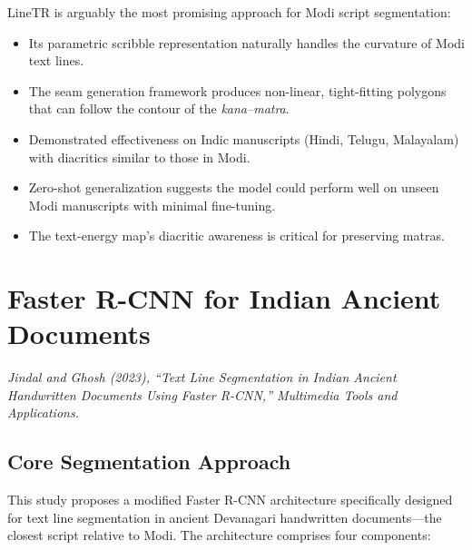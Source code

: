\documentclass[11pt, a4paper]{article}
\begin{document}
LineTR is arguably the most promising approach for Modi script segmentation:
\begin{itemize}[leftmargin=1.5em]
    \item Its parametric scribble representation naturally handles the curvature of Modi text lines.
    \item The seam generation framework produces non-linear, tight-fitting polygons that can follow the contour of the \textit{kana--matra}.
    \item Demonstrated effectiveness on Indic manuscripts (Hindi, Telugu, Malayalam) with diacritics similar to those in Modi.
    \item Zero-shot generalization suggests the model could perform well on unseen Modi manuscripts with minimal fine-tuning.
    \item The text-energy map's diacritic awareness is critical for preserving matras.
\end{itemize}


\section{Faster R-CNN for Indian Ancient Documents}
\label{sec:faster_rcnn}

\noindent\textit{Jindal and Ghosh (2023), ``Text Line Segmentation in Indian Ancient Handwritten Documents Using Faster R-CNN,'' Multimedia Tools and Applications.}

\subsection{Core Segmentation Approach}

This study proposes a modified Faster R-CNN architecture specifically designed for text line segmentation in ancient Devanagari handwritten documents---the closest script relative to Modi. The architecture comprises four components:
\end{document}

